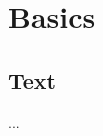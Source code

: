 \documentclass{article}
\begin{document}
\maketitle
\tableofcontents

\section{Basics}
\subsection{Text}

...
\end{document}
